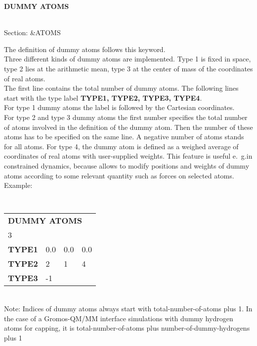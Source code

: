 \documentclass[twoside,10pt,titlepage,a4paper]{article}
\newcommand{\reflabel}[1]{\hypertarget{#1}}
\newcommand{\reflabel}[1]{\label{#1}}
\newcommand{\keyword}[5]{%
\vspace{1.0cm}
\begin{minipage}{15cm}
\reflabel{#1}{\textbf{\large #1}}%
\index{#1}%
\ \textbf{#2}%
\ \textbf{#3}%
\ \textit{#4}%
     \hfill\\\smallskip
     {Section: #5}
     \hfill\\\smallskip\vskip 10pt
\end{minipage}
}%
\newcommand{\desc}[1]{%
   \hspace*{\fill} \parbox{130mm}{\sloppy
                          {#1}%
                             }
     \hfill\\\smallskip
   }%
\newcommand{\desc}[1]{#1\vspace{1ex}}
\begin{document}
\keyword{DUMMY ATOMS}{}{}{}{\&ATOMS}
  \desc{The definition of dummy atoms follows this keyword.\\
      Three different kinds of dummy atoms are implemented.
      Type 1 is fixed in space, type 2 lies at the arithmetic
      mean, type 3 at the center of mass of the coordinates 
      of real atoms. \\
      The first line contains the total number of dummy atoms.
      The following lines start with the type label {\bf TYPE1, TYPE2, TYPE3, TYPE4}.\\
      For type 1 dummy atoms the label is followed by the Cartesian
      coordinates. \\
      For type 2 and type 3 dummy atoms the first number
      specifies the total number of atoms involved in the
      definition of the dummy atom. Then the number of these atoms
      has to be specified on the same line. 
      A negative number of atoms stands for all atoms. 
      For type 4, the dummy atom is defined as a weighed average
      of coordinates of real atoms with user-supplied weights. This
      feature is useful e.~g.\@ in constrained dynamics, because
      allows to modify positions and weights of dummy atoms according 
      to some relevant quantity such as forces on selected atoms.
      Example: \\
      
      {\tt
      \begin{tabular}{llll}
      \multicolumn{4}{l}{\bf DUMMY ATOMS }\\
      3           &     &     &          \\
      {\bf TYPE1} & 0.0 & 0.0 & 0.0      \\
      {\bf TYPE2} & 2   & 1   & 4        \\
      {\bf TYPE3} & -1
      \end{tabular}
      }\\
      
      Note: Indices of dummy atoms always start with total-number-of-atoms plus 1. 
      In the case of a Gromos-QM/MM interface simulations with dummy hydrogen atoms 
      for capping, it is total-number-of-atoms plus number-of-dummy-hydrogens plus 1 }
\end{document}
